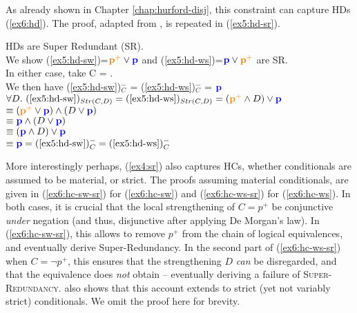 As already shown in Chapter \ref{chap:hurford-disj}, this constraint can capture HDs (\ref{ex6:hd}). The proof, adapted from \citet{Kalomoiros2024}, is repeated in (\ref{ex5:hd-sr}).

\begin{exe}
	 {HDs are Super Redundant (SR).\\
		We show (\ref{ex5:hd-sw})=$\textbf{\textcolor{orange}{p$^+$}}\vee\textbf{\textcolor{blue}{p}}$ and (\ref{ex5:hd-ws})=$\textbf{\textcolor{blue}{p}}\vee\textbf{\textcolor{orange}{p$^+$}}$ are SR.\\
		In either case, take C = \pplus.\\
		We then have (\ref{ex5:hd-sw})$^-_C$ = (\ref{ex5:hd-ws})$^-_C$ = $\textbf{\textcolor{blue}{p}}$\\
		$\forall D. \ (\textref{ex5:hd-sw})_{Str(C, D)} = (\textref{ex5:hd-ws})_{Str(C, D)} =  (\pplus \wedge D) \vee \p$\\
		 $\equiv (\textbf{\textcolor{orange}{p$^+$}} \vee \textbf{\textcolor{blue}{p}}) \wedge (D \vee \textbf{\textcolor{blue}{p}})$\\
		 $\equiv \textbf{\textcolor{blue}{p}} \wedge (D \vee \textbf{\textcolor{blue}{p}})$\\
		 $\equiv (\textbf{\textcolor{blue}{p}} \wedge D) \vee \textbf{\textcolor{blue}{p}}$\\
		 $\equiv \p = (\textref{ex5:hd-sw})^-_C = (\textref{ex5:hd-ws})^-_C$ 
	}
\end{exe}

More interestingly perhaps, (\ref{ex4:sr}) also captures HCs, whether conditionals are assumed to be material, or strict. The proofs assuming material conditionals, are given in (\ref{ex6:hc-sw-sr}) for (\ref{ex6:hc-sw}) and (\ref{ex6:hc-ws-sr}) for (\ref{ex6:hc-ws}). In both cases, it is crucial that the local strengthening of $C=p^+$ be conjunctive \textit{under} negation (and thus, disjunctive after applying De Morgan's law). In (\ref{ex6:hc-sw-sr}), this allows to remove $p^+$ from the chain of logical equivalences, and eventually derive Super-Redundancy. In the second part of (\ref{ex6:hc-ws-sr}) when $C=\neg p^+$, this ensures that the strengthening $D$ \textit{can} be disregarded, and that the equivalence does \textit{not} obtain -- eventually deriving a failure of \textsc{Super-Redundancy}. \citet{Kalomoiros2024} also shows that this account extends to strict (yet not variably strict) conditionals. We omit the proof here for brevity.

